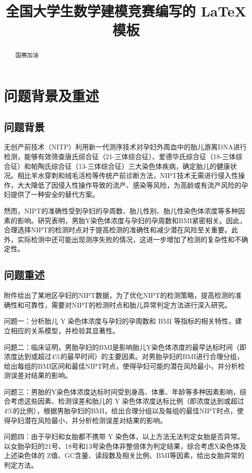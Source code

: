 \documentclass[withoutpreface,bwprint]{cumcmthesis} %
\title{全国大学生数学建模竞赛编写的 \LaTeX{} 模板}
\begin{document}
 \maketitle
 \begin{abstract}
国赛加油

\end{abstract}





\section{问题背景及重述}
\subsection{问题背景}
无创产前技术（NITP）利用新一代测序技术对孕妇外周血中的胎儿游离DNA进行检测，能够有效筛查唐氏综合征（21-三体综合征）、爱德华氏综合征（18-三体综合征）和帕陶氏综合征（13-三体综合征）三大染色体疾病，确定胎儿的健康状况。相比羊水穿刺和绒毛活检等传统产前诊断方法，NIPT技术无需进行侵入性操作，大大降低了因侵入性操作导致的流产、感染等风险，为高龄或有流产风险的孕妇提供了一种安全的替代方案。
\par 然而，NIPT的准确性受到孕妇的孕周数、胎儿性别、胎儿性染色体浓度等多种因素的影响。研究表明，男胎Y染色体浓度与孕妇的孕周数和BMI紧密相关。因此，合理选择NIPT的检测时点对于提高检测的准确性和减少潜在风险至关重要。此外，实际检测中还可能出现测序失败的情况，这进一步增加了检测的复杂性和不确定性。

\subsection{问题重述}
附件给出了某地区孕妇的NIPT数据，为了优化NIPT的检测策略，提高检测的准确性和可靠性，需要对NIPT的检测时点和胎儿异常判定方法进行深入研究。
\par 问题一：分析胎儿 Y 染色体浓度与孕妇的孕周数和 BMI 等指标的相关特性，建立相应的关系模型，并检验其显著性。
\par 问题二：临床证明，男胎孕妇的BMI是影响胎儿Y染色体浓度的最早达标时间（即浓度达到或超过4\%的最早时间）的主要因素。对男胎孕妇的BMI进行合理分组，给出每组的BMI区间和最佳NIPT时点，使得孕妇可能的潜在风险最小，并分析检测误差对结果的影响。 
\par 问题三：男胎的Y染色体浓度达标时间受到身高、体重、年龄等多种因素影响，综合考虑这些因素、检测误差和胎儿的 Y 染色体浓度达标比例（即浓度达到或超过 4\%的比例），根据男胎孕妇的BMI，给出合理分组以及每组的最佳NIPT时点，使得孕妇潜在风险最小，并分析检测误差对结果的影响。 
\par 问题四：由于孕妇和女胎都不携带 Y 染色体，以上方法无法判定女胎是否异常。以女胎孕妇的21号、18号和13号染色体非整倍体为判定结果，综合考虑X染色体及上述染色体的 Z值、GC含量、读段数及相关比例、BMI等因素，给出女胎异常的判定方法。
\end{document}
